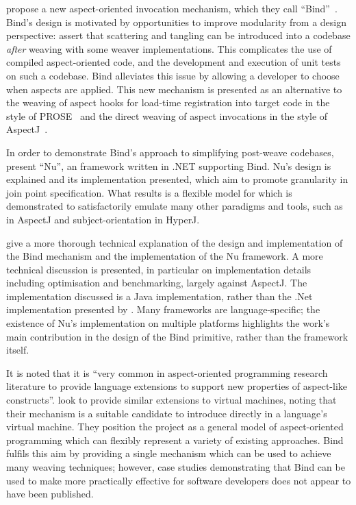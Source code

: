 \citeauthor{rajan2006nu_towardsao_invocation} propose a new aspect-oriented
invocation mechanism, which they call
``Bind''~\cite{rajan2006nu_towardsao_invocation}. Bind's design is motivated by
opportunities to improve modularity from a design perspective:
\citeauthor{rajan2006nu_towardsao_invocation} assert that scattering and
tangling can be introduced into a codebase \emph{after} weaving with some weaver
implementations. This complicates the use of compiled aspect-oriented code, and
the development and execution of unit tests on such a codebase. Bind alleviates
this issue by allowing a developer to choose when aspects are applied. This new
mechanism is presented as an alternative to the weaving of aspect hooks for
load-time registration into target code in the style of
PROSE~\cite{popovici2002PROSE,popovici2003JITaspects} and the direct weaving of
aspect invocations in the style of AspectJ~\cite{aspectj_intro}.

In order to demonstrate Bind's approach to simplifying post-weave codebases,
\citet{rajan2006nu_towardsao_invocation} present ``Nu'', an \aspectorientation{}
framework written in .NET supporting Bind. Nu's design is explained and its
implementation presented, which aim to promote granularity in join point
specification. What results is a flexible model for \aspectorientation{} which
is demonstrated to satisfactorily emulate many other paradigms and tools, such
as \aspectorientation{} in AspectJ and subject-orientation in
HyperJ.

\citet{dyerNUmasters} give a more thorough technical explanation of the design
and implementation of the Bind mechanism and the implementation of the Nu
framework. A more technical discussion is presented, in particular on
implementation details including optimisation and benchmarking, largely against
AspectJ. The implementation discussed is a Java implementation, rather than the
.Net implementation presented by \citet{rajan2006nu_towardsao_invocation}. Many
\aspectorientation{} frameworks are language-specific; the existence of Nu's
implementation on multiple platforms highlights the work's main contribution in
the design of the Bind primitive, rather than the framework itself.

It is noted that it is ``very common in aspect-oriented programming research
literature to provide language extensions to support new properties of
aspect-like constructs''.
\citeauthor{rajan2006nu_towardsao_invocation} look to provide similar extensions
to virtual machines, noting that their mechanism is a suitable candidate to
introduce \aspectorientation{} directly in a language's virtual machine. They
position the project as a general model of aspect-oriented programming which can
flexibly represent a variety of existing approaches. Bind fulfils this aim by
providing a single mechanism which can be used to achieve many weaving
techniques; however, case studies demonstrating that Bind can be used to make
\aspectorientation{} more practically effective for software developers does not
appear to have been published.


